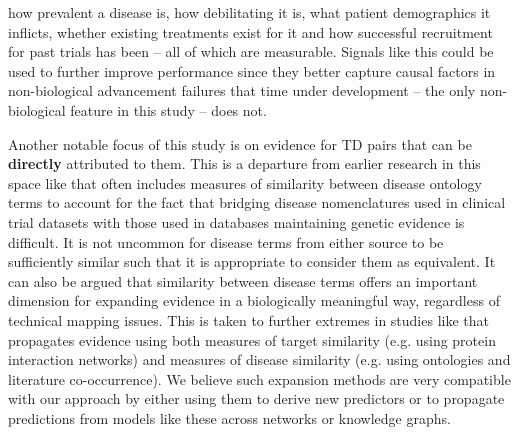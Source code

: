 \documentclass{article}
\begin{document}
how prevalent a disease is, how debilitating it is, what patient demographics it inflicts, whether existing treatments exist for it and how successful recruitment for past trials has been -- all of which are measurable. Signals like this could be used to further improve performance since they better capture causal factors in non-biological advancement failures that time under development -- the only non-biological feature in this study -- does not.

Another notable focus of this study is on evidence for TD pairs that can be \textbf{directly} attributed to them. This is a departure from earlier research in this space like \cite{Nelson2015-eg} that often includes measures of similarity between disease ontology terms to account for the fact that bridging disease nomenclatures used in clinical trial datasets with those used in databases maintaining genetic evidence is difficult. It is not uncommon for disease terms from either source to be sufficiently similar such that it is appropriate to consider them as equivalent. It can also be argued that similarity between disease terms offers an important dimension for expanding evidence in a biologically meaningful way, regardless of technical mapping issues. This is taken to further extremes in studies like \cite{PMID:33262371} that propagates evidence using both measures of target similarity (e.g. using protein interaction networks) and measures of disease similarity (e.g. using ontologies and literature co-occurrence). We believe such expansion methods are very compatible with our approach by either using them to derive new predictors or to propagate predictions from models like these across networks or knowledge graphs.
\end{document}
